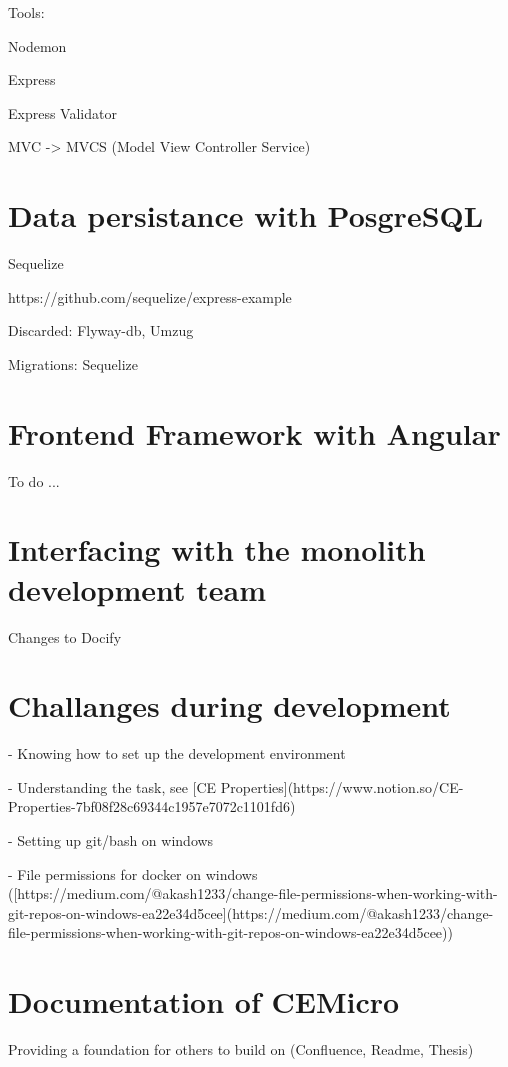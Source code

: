 Tools:

Nodemon

Express

Express Validator

MVC -> MVCS (Model View Controller Service)


\section{Data persistance with PosgreSQL}

Sequelize

https://github.com/sequelize/express-example

Discarded: Flyway-db, Umzug

Migrations: Sequelize


\section{Frontend Framework with Angular}

To do ...


\section{Interfacing with the monolith development team}

Changes to Docify


\section{Challanges during development}

- Knowing how to set up the development environment

- Understanding the task, see [CE Properties](https://www.notion.so/CE-Properties-7bf08f28c69344c1957e7072c1101fd6)

- Setting up git/bash on windows

- File permissions for docker on windows ([https://medium.com/@akash1233/change-file-permissions-when-working-with-git-repos-on-windows-ea22e34d5cee](https://medium.com/@akash1233/change-file-permissions-when-working-with-git-repos-on-windows-ea22e34d5cee))


\section{Documentation of CEMicro}

Providing a foundation for others to build on (Confluence, Readme, Thesis)
